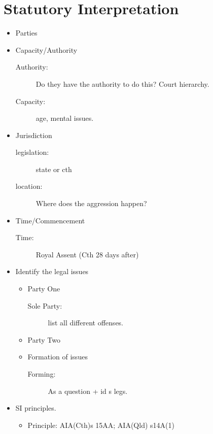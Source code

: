 \section*{Statutory Interpretation}
\begin{itemize}
    \item Parties
    \item Capacity/Authority
        \begin{description}
            \item[Authority:] Do they have the authority to do this? Court hierarchy. 
            \item[Capacity:] age, mental issues.  
        \end{description}
    \item Jurisdiction
        \begin{description}
            \item[legislation:] state or cth
            \item[location:] Where does the aggression happen? 
        \end{description}
    \item Time/Commencement
        \begin{description}
            \item[Time:]Royal Assent (Cth 28 days after)
        \end{description}
    \item Identify the legal issues
        \begin{itemize}
            \item Party One 
                \begin{description}
                    \item[Sole Party:] list all different offenses.  
                \end{description}
            \item Party Two 
            \item Formation of issues\
                \begin{description}
                    \item[Forming:] As a question + id s legs.  
                \end{description}
        \end{itemize}
    \item SI principles. 
    \begin{itemize}
            \item Principle: AIA(Cth)s 15AA; AIA(Qld) s14A(1)
                \begin{description}

\end{description}
\end{itemize}
\end{itemize}
